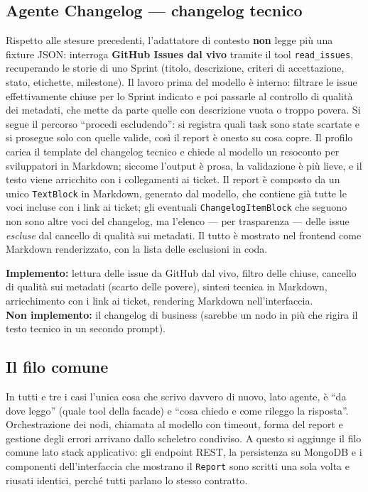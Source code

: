 \documentclass[11pt,a4paper]{article}
\begin{document}
\subsection{Agente Changelog --- changelog tecnico}

Rispetto alle stesure precedenti, l'adattatore di contesto \textbf{non} legge più una fixture JSON: interroga \textbf{GitHub Issues dal vivo} tramite il tool \texttt{read\_issues}, recuperando le storie di uno Sprint (titolo, descrizione, criteri di accettazione, stato, etichette, milestone). Il lavoro prima del modello è interno: filtrare le issue effettivamente chiuse per lo Sprint indicato e poi passarle al controllo di qualità dei metadati, che mette da parte quelle con descrizione vuota o troppo povera. Si segue il percorso ``procedi escludendo'': si registra quali task sono state scartate e si prosegue solo con quelle valide, così il report è onesto su cosa copre. Il profilo carica il template del changelog tecnico e chiede al modello un resoconto per sviluppatori in Markdown; siccome l'output è prosa, la validazione è più lieve, e il testo viene arricchito con i collegamenti ai ticket. Il report è composto da un unico \texttt{TextBlock} in Markdown, generato dal modello, che contiene già tutte le voci incluse con i link ai ticket; gli eventuali \texttt{ChangelogItemBlock} che seguono non sono altre voci del changelog, ma l'elenco --- per trasparenza --- delle issue \emph{escluse} dal cancello di qualità sui metadati. Il tutto è mostrato nel frontend come Markdown renderizzato, con la lista delle esclusioni in coda.

\textbf{Implemento:} lettura delle issue da GitHub dal vivo, filtro delle chiuse, cancello di qualità sui metadati (scarto delle povere), sintesi tecnica in Markdown, arricchimento con i link ai ticket, rendering Markdown nell'interfaccia.\\
\textbf{Non implemento:} il changelog di business (sarebbe un nodo in più che rigira il testo tecnico in un secondo prompt).

\subsection{Il filo comune}

In tutti e tre i casi l'unica cosa che scrivo davvero di nuovo, lato agente, è ``da dove leggo'' (quale tool della facade) e ``cosa chiedo e come rileggo la risposta''. Orchestrazione dei nodi, chiamata al modello con timeout, forma del report e gestione degli errori arrivano dallo scheletro condiviso. A questo si aggiunge il filo comune lato stack applicativo: gli endpoint REST, la persistenza su MongoDB e i componenti dell'interfaccia che mostrano il \texttt{Report} sono scritti una sola volta e riusati identici, perché tutti parlano lo stesso contratto.
\end{document}

